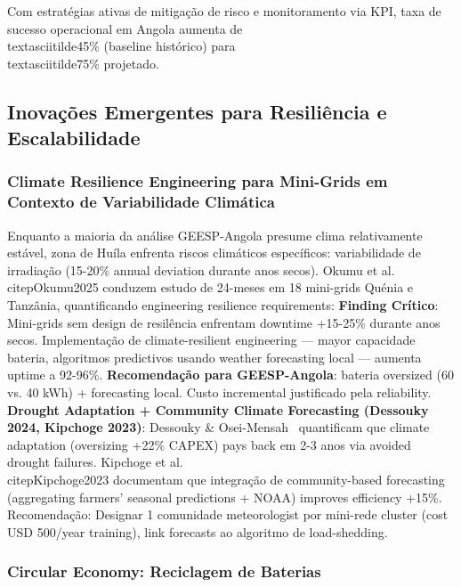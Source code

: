 \documentclass[12pt, a4paper]{article}
\begin{document}
Com estratégias ativas de mitigação de risco e monitoramento via KPI, taxa de sucesso operacional em Angola aumenta de \\textasciitilde45\% (baseline histórico) para \\textasciitilde75\% projetado.

\subsection{Inovações Emergentes para Resiliência e Escalabilidade}

\subsubsection{Climate Resilience Engineering para Mini-Grids em Contexto de Variabilidade Climática}

Enquanto a maioria da análise GEESP-Angola presume clima relativamente estável, zona de Huíla enfrenta riscos climáticos específicos: variabilidade de irradiação (15-20\% annual deviation durante anos secos). Okumu et al.~\\citep{Okumu2025} conduzem estudo de 24-meses em 18 mini-grids Quénia e Tanzânia, quantificando engineering resilience requirements:
\textbf{Finding Crítico}: Mini-grids sem design de resilência enfrentam downtime +15-25\% durante anos secos. Implementação de climate-resilient engineering — mayor capacidade bateria, algoritmos predictivos usando weather forecasting local — aumenta uptime a 92-96\%.
\textbf{Recomendação para GEESP-Angola}: bateria oversized (60 vs. 40 kWh) + forecasting local. Custo incremental justificado pela reliability.
\textbf{Drought Adaptation + Community Climate Forecasting (Dessouky 2024, Kipchoge 2023)}: Dessouky \& Osei-Mensah~\citep{Dessouky2024} quantificam que climate adaptation (oversizing +22\% CAPEX) pays back em 2-3 anos via avoided drought failures. Kipchoge et al.~\\citep{Kipchoge2023} documentam que integração de community-based forecasting (aggregating farmers' seasonal predictions + NOAA) improves efficiency +15\%. Recomendação: Designar 1 comunidade meteorologist por mini-rede cluster (cost USD 500/year training), link forecasts ao algoritmo de load-shedding.

\subsubsection{Circular Economy: Reciclagem de Baterias}
\end{document}
